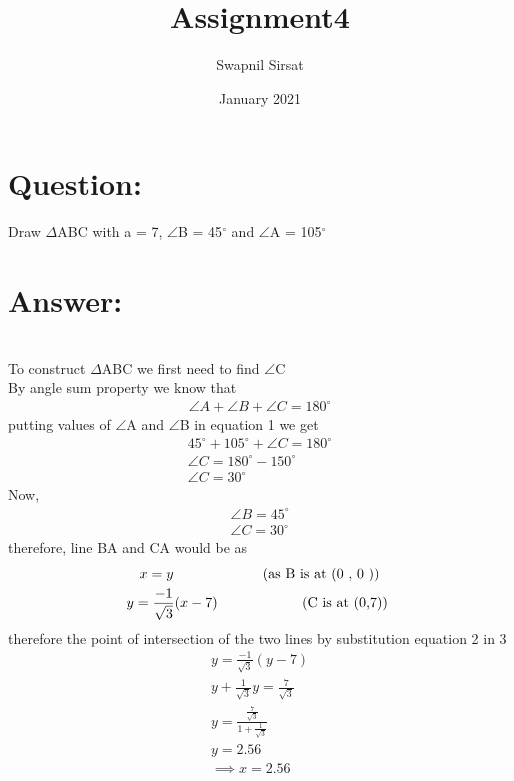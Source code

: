 \documentclass{article}
\title{Assignment4}
\author{Swapnil Sirsat}
\date{January 2021}
\begin{document}
\maketitle
\section*{Question: }
Draw $\Delta$ABC with a = 7, $\angle$B = 45$^\circ$
and $\angle$A = 105$^\circ$
\section*{Answer: }
\\
To construct $\Delta$ABC we first need to find $\angle$C\\
By angle sum property we know that
\begin{align}
    \angle A + \angle B + \angle C = 180^\circ
\end{align}
putting values of $\angle$A and $\angle$B in equation 1 we get
\begin{gather*}
    45^\circ + 105^\circ + \angle C = 180^\circ\\
        \angle C = 180^\circ - 150^\circ \\
        \angle C = 30^\circ
\end{gather*}
Now,
\begin{gather*}
    \angle B = 45^\circ\\
    \angle C = 30^\circ 
\end{gather*}
therefore, line BA and CA would be as 
\begin{gather}
    x = y         \mbox{     \hspace{2cm} (as B is at (0 , 0 ))} \\
    y = \frac{-1}{\sqrt{3}}(x - 7 ) \mbox{\hspace{2cm} (C is at (0,7)) }
\end{gather}
therefore the point of intersection of the two lines by substitution equation 2 in 3
\begin{gather*}
    y = \frac{-1}{\sqrt{3}} (y - 7) \\
    y + \frac{1}{\sqrt{3}} y = \frac{7}{\sqrt{3}} \\
    y =\frac{\frac{7}{\sqrt{3}}}{1+\frac{1}{\sqrt{3}}} \\
    y = 2.56\\
    \implies x = 2.56
\end{gather*}
\end{document}
